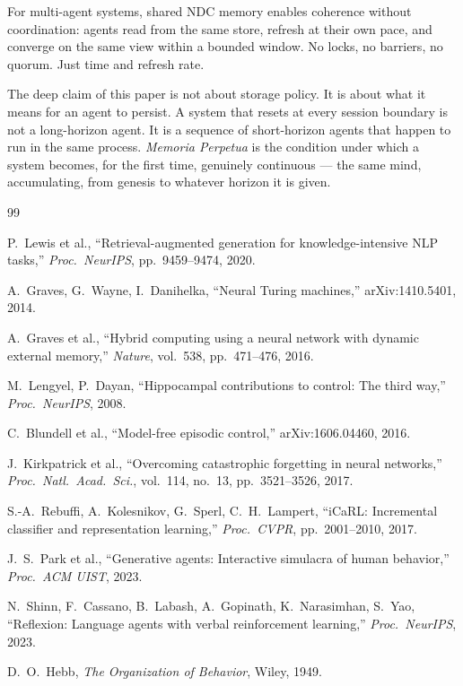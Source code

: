 \documentclass[12pt]{article}
\begin{document}
For multi-agent systems, shared NDC memory enables coherence without
coordination: agents read from the same store, refresh at their own pace, and
converge on the same view within a bounded window.  No locks, no barriers, no
quorum.  Just time and refresh rate.

The deep claim of this paper is not about storage policy.  It is about what it
means for an agent to persist.  A system that resets at every session boundary
is not a long-horizon agent.  It is a sequence of short-horizon agents that
happen to run in the same process.  \emph{Memoria Perpetua} is the condition
under which a system becomes, for the first time, genuinely continuous — the
same mind, accumulating, from genesis to whatever horizon it is given.

\begin{thebibliography}{99}

P.~Lewis et al.,
``Retrieval-augmented generation for knowledge-intensive NLP tasks,''
\textit{Proc.\ NeurIPS}, pp.~9459--9474, 2020.

A.~Graves, G.~Wayne, I.~Danihelka,
``Neural Turing machines,''
arXiv:1410.5401, 2014.

A.~Graves et al.,
``Hybrid computing using a neural network with dynamic external memory,''
\textit{Nature}, vol.~538, pp.~471--476, 2016.

M.~Lengyel, P.~Dayan,
``Hippocampal contributions to control: The third way,''
\textit{Proc.\ NeurIPS}, 2008.

C.~Blundell et al.,
``Model-free episodic control,''
arXiv:1606.04460, 2016.

J.~Kirkpatrick et al.,
``Overcoming catastrophic forgetting in neural networks,''
\textit{Proc.\ Natl.\ Acad.\ Sci.}, vol.~114, no.~13, pp.~3521--3526, 2017.

S.-A.~Rebuffi, A.~Kolesnikov, G.~Sperl, C.~H.~Lampert,
``iCaRL: Incremental classifier and representation learning,''
\textit{Proc.\ CVPR}, pp.~2001--2010, 2017.

J.~S.~Park et al.,
``Generative agents: Interactive simulacra of human behavior,''
\textit{Proc.\ ACM UIST}, 2023.

N.~Shinn, F.~Cassano, B.~Labash, A.~Gopinath, K.~Narasimhan, S.~Yao,
``Reflexion: Language agents with verbal reinforcement learning,''
\textit{Proc.\ NeurIPS}, 2023.

D.~O.~Hebb,
\emph{The Organization of Behavior},
Wiley, 1949.

\end{thebibliography}
\end{document}

